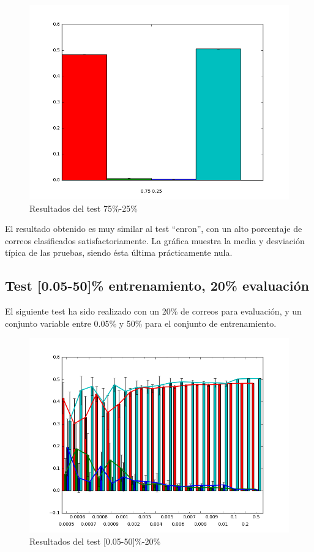 \begin{figure}[ht]
	\centering
	\includegraphics[width=\textwidth, keepaspectratio]{img/7525}
	\caption{Resultados del test 75\%-25\%}
	\label{fig:7525}
\end{figure}

El resultado obtenido es muy similar al test ``enron'', con un alto porcentaje
de correos clasificados satisfactoriamente. La gráfica muestra la media y
desviación típica de las pruebas, siendo ésta última prácticamente nula.

\clearpage
\subsection{Test [0.05-50]\% entrenamiento, 20\% evaluación}

El siguiente test ha sido realizado con un 20\% de correos para evaluación, y un
conjunto variable entre 0.05\% y 50\% para el conjunto de entrenamiento.

\begin{figure}[ht]
	\centering
	\includegraphics[width=\textwidth, keepaspectratio]{img/ev_tr}
	\caption{Resultados del test [0.05-50]\%-20\%}
	\label{fig:ev_tr}
\end{figure}

